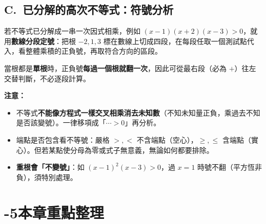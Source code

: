 \documentclass[11pt]{article}
\begin{document}

\subsection*{\sffamily C.\ 已分解的高次不等式：符號分析}

若不等式已分解成一串一次因式相乘，例如 $(x-1)(x+2)(x-3)>0$，就用\textbf{數線分段定號}：把根 $-2,1,3$ 標在數線上切成四段，在每段任取一個測試點代入，看整體乘積的正負號，再取符合方向的區段。

當根都是\textbf{單根}時，正負號\textbf{每過一個根就翻一次}，因此可從最右段（必為 $+$）往左交替判斷，不必逐段計算。


\textbf{注意：}
\begin{itemize}\setlength{\itemsep}{1pt}
\item 不等式\textbf{不能像方程式一樣交叉相乘消去未知數}（不知未知量正負，乘過去不知是否該變號）。一律移項成「$\cdots>0$」再分析。
\item 端點是否包含看不等號：嚴格 $>,<$ 不含端點（空心），$\ge,\le$ 含端點（實心）。但若某點使分母為零或式子無意義，無論如何都要排除。
\item \textbf{重根會「不變號」}：如 $(x-1)^2(x-3)>0$，過 $x=1$ 時號不翻（平方恆非負），須特別處理。
\end{itemize}

\section*{-5\quad 本章重點整理}
\end{document}
